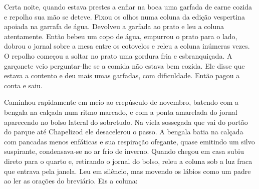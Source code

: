 Certa noite, quando estava prestes a enfiar na boca uma garfada de carne cozida
e repolho sua mão se deteve.  Fixou os olhos numa coluna da edição
vespertina apoiada na garrafa de água.  Devolveu a garfada ao prato e leu a
coluna atentamente.  Então bebeu um copo de água, empurrou o prato para o lado,
dobrou o jornal sobre a mesa entre os cotovelos e releu a coluna inúmeras
vezes.  O repolho começou a soltar no prato uma gordura fria e esbranquiçada.
A garçonete veio perguntar-lhe se a comida não estava bem cozida.  Ele disse
que estava a contento e deu mais umas garfadas, com dificuldade.  Então pagou a
conta e saiu.

Caminhou rapidamente em meio ao crepúsculo de novembro, batendo com a bengala
na calçada num ritmo marcado, e com a ponta amarelada do jornal aparecendo no
bolso lateral do sobretudo.  Na viela sossegada que vai do portão do parque até
Chapelizod ele desacelerou o passo.  A bengala batia na calçada com pancadas
menos enfáticas e sua respiração ofegante, quase emitindo um silvo suspirante,
condensava-se no ar frio de inverno.  Quando chegou em casa subiu direto para o
quarto e, retirando o jornal do bolso, releu a coluna sob a luz fraca que
entrava pela janela.  Leu em silêncio, mas movendo os lábios como um padre ao
ler as orações do breviário.  Eis a coluna:


